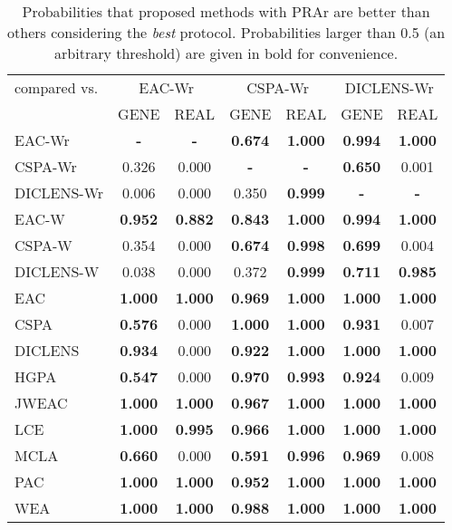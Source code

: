\begin{table}
	\centering
		\caption{Probabilities that proposed methods with PRAr are better than others considering the \emph{best} protocol. Probabilities larger than 0.5 (an arbitrary threshold) are given in bold for convenience.}
		\label{tab:bayescomp:best}
		\begin{tabular*}{1.0\linewidth}{@{\extracolsep{\fill}} l c c c c c c }
			\toprule
			{compared vs.} & \multicolumn{2}{c}{EAC-Wr} & \multicolumn{2}{c}{CSPA-Wr} & \multicolumn{2}{c}{DICLENS-Wr}\\ 
			\cmidrule(lr){2-3}
			\cmidrule(lr){4-5}
			\cmidrule(lr){6-7}
			 & \multicolumn{1}{c}{GENE} & \multicolumn{1}{c}{REAL} & \multicolumn{1}{c}{GENE} & \multicolumn{1}{c}{REAL} & \multicolumn{1}{c}{GENE} & \multicolumn{1}{c}{REAL} \\ \midrule
			EAC-Wr& \textbf{-} & \textbf{-}  & \textbf{0.674} & \textbf{1.000} & \textbf{0.994} & \textbf{1.000}\\
			CSPA-Wr & 0.326 & 0.000& \textbf{-} & \textbf{-}  & \textbf{0.650} & 0.001\\
			DICLENS-Wr & 0.006 & 0.000 & 0.350 & \textbf{0.999}& \textbf{-} & \textbf{-} \\
			EAC-W & \textbf{0.952} & \textbf{0.882} & \textbf{0.843} & \textbf{1.000} & \textbf{0.994} & \textbf{1.000}\\
			CSPA-W & 0.354 & 0.000 & \textbf{0.674} & \textbf{0.998} & \textbf{0.699} & 0.004\\
			DICLENS-W & 0.038 & 0.000 & 0.372 & \textbf{0.999} & \textbf{0.711} & \textbf{0.985}\\
			EAC & \textbf{1.000} & \textbf{1.000} & \textbf{0.969} & \textbf{1.000} & \textbf{1.000} & \textbf{1.000}\\
			CSPA & \textbf{0.576} & 0.000 & \textbf{1.000} & \textbf{1.000} & \textbf{0.931} & 0.007\\
			DICLENS & \textbf{0.934} & 0.000 & \textbf{0.922} & \textbf{1.000} & \textbf{1.000} & \textbf{1.000}\\
			HGPA & \textbf{0.547} & 0.000 & \textbf{0.970} & \textbf{0.993} & \textbf{0.924} & 0.009\\
			JWEAC & \textbf{1.000} & \textbf{1.000} & \textbf{0.967} & \textbf{1.000} & \textbf{1.000} & \textbf{1.000}\\
			LCE & \textbf{1.000} & \textbf{0.995} & \textbf{0.966} & \textbf{1.000} & \textbf{1.000} & \textbf{1.000}\\
			MCLA & \textbf{0.660} & 0.000 & \textbf{0.591} & \textbf{0.996} & \textbf{0.969} & 0.008\\
			PAC & \textbf{1.000} & \textbf{1.000} & \textbf{0.952} & \textbf{1.000} & \textbf{1.000} & \textbf{1.000}\\
			WEA & \textbf{1.000} & \textbf{1.000} & \textbf{0.988} & \textbf{1.000} & \textbf{1.000} & \textbf{1.000}\\
			\bottomrule
		\end{tabular*}
\end{table}
